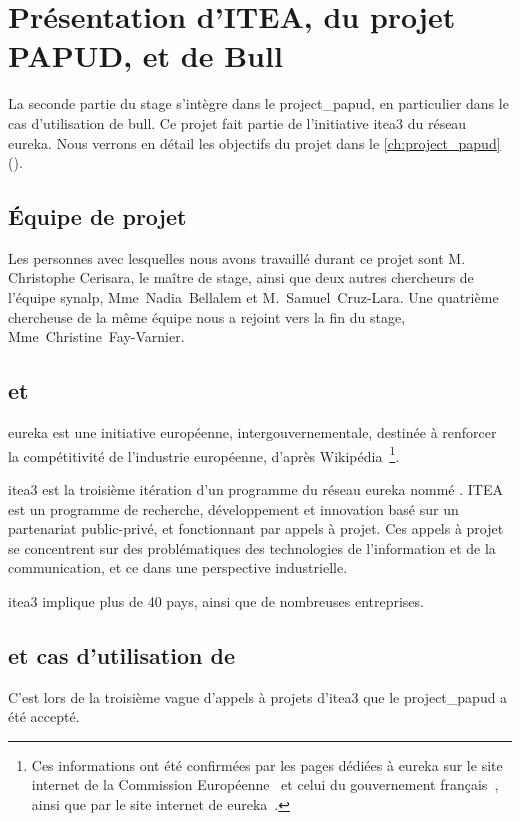 \chapter{Présentation d'ITEA, du projet PAPUD, et de Bull}
La seconde partie du stage s'intègre dans le \gls{project_papud}, en particulier dans le cas d'utilisation de \gls{bull}. Ce projet fait partie de l'initiative \gls{itea3} du réseau \gls{eureka}.
%
Nous verrons en détail les objectifs du projet dans le \autoref{ch:project_papud} ().


\section{Équipe de projet}\label{sec:papud_colabo}
Les personnes avec lesquelles nous avons travaillé durant ce projet sont M. Christophe Cerisara, le maître de stage, ainsi que deux autres chercheurs de l'équipe \gls{synalp}, \mbox{Mme~Nadia~Bellalem} et \mbox{M.~Samuel~Cruz-Lara}.
Une quatrième chercheuse de la même équipe nous a rejoint vers la fin du stage, \mbox{Mme~Christine~Fay-Varnier}.

\section{ et }
\og\gls{eureka} est une initiative européenne, intergouvernementale, destinée à renforcer la compétitivité de l’industrie européenne\fg{}, d'après Wikipédia~\autocite{wiki_eureka}\footnote{Ces informations ont été confirmées par les pages dédiées à \gls{eureka} sur le site internet de la Commission Européenne~\autocite{ce_eureka} et celui du gouvernement français~\autocite{fr_eureka}, ainsi que par le site internet de \gls{eureka}~\autocite{eureka}.}.

\gls{itea3} est la troisième itération d'un programme du réseau \gls{eureka} nommé .
ITEA est un programme de recherche, développement et innovation basé sur un partenariat public-privé, et fonctionnant par appels à projet.
Ces appels à projet se concentrent sur des problématiques des technologies de l'information et de la communication, et ce dans une perspective industrielle.

\gls{itea3} implique plus de 40 pays, ainsi que de nombreuses entreprises.

\pagebreak
\section{ et cas d'utilisation de }
C'est lors de la troisième vague d'appels à projets d'\gls{itea3} que le  \gls{project_papud} a été accepté.

